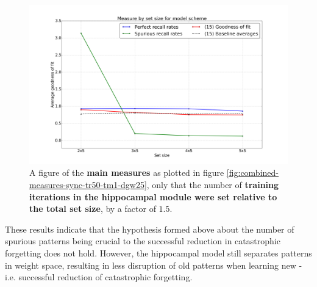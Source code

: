 \begin{figure}
    \centering
    \includegraphics[width=13cm]{fig/hypothesis-test-sync/combined-measures-sync-tm1-tr30-relative-iters}
    \caption{A figure of the \textbf{main measures} as plotted in figure \ref{fig:combined-measures-sync-tr50-tm1-dgw25}, only that the number of \textbf{training iterations in the hippocampal module were set relative to the total set size}, by a factor of $1.5$.}
    \label{fig:combined-measures-sync-tm1-tr30-relative-iters}
\end{figure}

These results indicate that the hypothesis formed above about the number of spurious patterns being crucial to the successful reduction in catastrophic forgetting does not hold. However, the hippocampal model still separates patterns in weight space, resulting in less disruption of old patterns when learning new - i.e. successful reduction of catastrophic forgetting.



